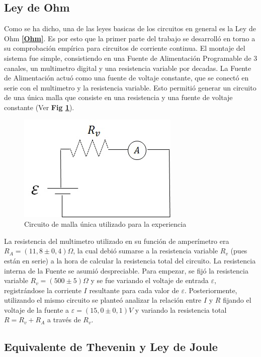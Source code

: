 \documentclass[11pt,a4paper]{article}
\begin{document}
\subsection{Ley de Ohm}

Como se ha dicho, una de las leyes basicas de los circuitos en general es la Ley de Ohm \textbf{\eqref{Ohm}}. Es por esto que la primer parte del trabajo se desarrolló en torno a su comprobación empírica para circuitos de corriente continua. El montaje del sistema fue simple, consistiendo en una Fuente de Alimentación Programable de 3 canales, un multimetro digital y una resistencia variable por decadas. La Fuente de Alimentación actuó como una fuente de voltaje constante, que se conectó en serie con el multimetro y la resistencia variable. Esto permitió generar un circuito de una única malla que consiste en una resistencia y una fuente de voltaje constante (Ver \textbf{Fig \ref{fig:circ_simp}}).


\begin{figure}[h]
  \centering
  \includegraphics[scale= 0.6]{Circuito_simple}
  \caption{Circuito de malla única utilizado para la experiencia}
  \label{fig:circ_simp}
\end{figure}

La resistencia del multimetro utilizado en su función de amperímetro era $R_{A} = (11,8 \pm 0,4) \Omega$, la cual debió sumarse a la resistencia variable $R_v$ (pues están en serie) a la hora de calcular la resistencia total del circuito. La resistencia interna de la Fuente se asumió despreciable. Para empezar, se fijó la resistencia variable $R_v = (500 \pm 5)\Omega$ y se fue variando el voltaje de entrada $\varepsilon$, registrándose la corriente $I$ resultante para cada valor de $\varepsilon$. Posteriormente, utilizando el mismo circuito se planteó analizar la relación entre $I$ y $R$ fijando el voltaje de la fuente a $\varepsilon = (15,0 \pm 0,1)V$ y variando la resistencia total $R = R_v + R_A$ a través de $R_v$. 


\subsection{Equivalente de Thevenin y Ley de Joule}
\end{document}
